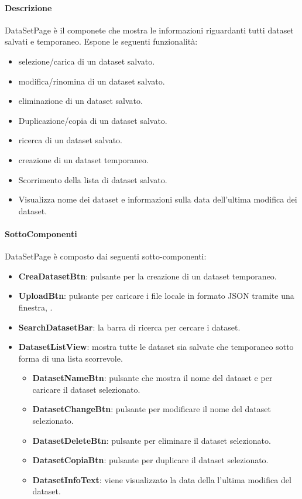 \paragraph{Descrizione}
DataSetPage è il componete che mostra le informazioni riguardanti tutti dataset salvati e temporaneo. Espone le seguenti funzionalità:
\begin{itemize}
    \item selezione/carica di un dataset salvato.
    \item modifica/rinomina di un dataset salvato.
    \item eliminazione di un dataset salvato.
    \item Duplicazione/copia di un dataset salvato.
    \item ricerca di un dataset salvato.
    \item creazione di un dataset temporaneo.
    \item Scorrimento della lista di dataset salvato.
    \item Visualizza nome dei dataset e informazioni sulla data dell'ultima modifica dei dataset.
\end{itemize}
\paragraph{SottoComponenti}
DataSetPage è composto dai seguenti sotto-componenti:
\begin{itemize}
    \item \textbf{CreaDatasetBtn}: pulsante per la creazione di un dataset temporaneo.
    \item \textbf{UploadBtn}: pulsante per caricare i file locale in formato JSON tramite una finestra, .
    \item \textbf{SearchDatasetBar}: la barra di ricerca per cercare i dataset.
    \item \textbf{DatasetListView}: mostra tutte le dataset sia salvate che temporaneo sotto forma di una lista scorrevole.
    \begin{itemize}
        \item \textbf{DatasetNameBtn}: pulsante che mostra il nome del dataset e per caricare il dataset selezionato.
        \item \textbf{DatasetChangeBtn}: pulsante per modificare il nome del dataset selezionato.
        \item \textbf{DatasetDeleteBtn}: pulsante per eliminare il dataset selezionato.
        \item \textbf{DatasetCopiaBtn}: pulsante per duplicare il dataset selezionato.
        \item \textbf{DatasetInfoText}: viene visualizzato la data della l'ultima modifica del dataset.
    \end{itemize}
\end{itemize}

